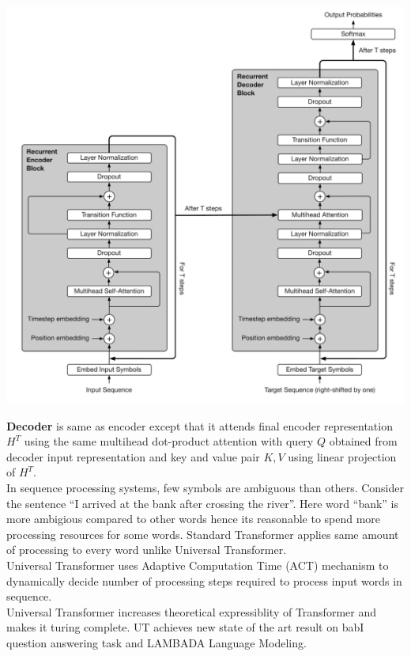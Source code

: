 \documentclass{article}
\newcommand{\quotes}[1]{``#1''}
\begin{document}
\begin{multicols}{2}
\begin{center}
        \captionsetup{type=figure}
        \includegraphics[height=.70\textwidth , width=.40\textwidth]{universal.png}
\end{center}

\textbf{Decoder} is same as encoder except that it attends final encoder representation $H^T$ using the same multihead dot-product attention with query $Q$ obtained from decoder input representation and key and value pair $K, V$ using linear projection of $H^T$.\\
In sequence processing systems, few symbols are ambiguous than others. Consider the sentence \quotes{I arrived at the bank after crossing the river}. Here word \quotes{bank} is more ambigious compared to other words hence its reasonable to spend more processing resources for some words. Standard Transformer applies same amount of processing to every word unlike Universal Transformer. \\
Universal Transformer uses Adaptive Computation Time (ACT) \cite{DBLP:journals/corr/Graves16} mechanism to dynamically decide number of processing steps required to process input words in sequence. \\
Universal Transformer increases theoretical expressiblity of Transformer and makes it turing complete.
UT achieves new state of the art result on babI question answering task and  LAMBADA Language Modeling.

\end{multicols}
\end{document}
